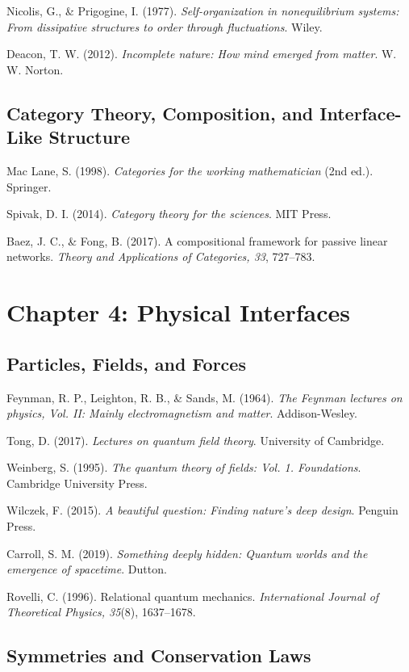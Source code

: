 \documentclass[
  openright]{book}
\begin{document}
Nicolis, G., \& Prigogine, I. (1977). \emph{Self-organization in
nonequilibrium systems: From dissipative structures to order through
fluctuations}. Wiley.

Deacon, T. W. (2012). \emph{Incomplete nature: How mind emerged from
matter}. W. W. Norton.

\subsection{Category Theory, Composition, and Interface-Like
Structure}\label{category-theory-composition-and-interface-like-structure-1}

Mac Lane, S. (1998). \emph{Categories for the working mathematician}
(2nd ed.). Springer.

Spivak, D. I. (2014). \emph{Category theory for the sciences}. MIT
Press.

Baez, J. C., \& Fong, B. (2017). A compositional framework for passive
linear networks. \emph{Theory and Applications of Categories, 33},
727--783.

\section{Chapter 4: Physical
Interfaces}\label{chapter-4-physical-interfaces}

\subsection{Particles, Fields, and
Forces}\label{particles-fields-and-forces}

Feynman, R. P., Leighton, R. B., \& Sands, M. (1964). \emph{The Feynman
lectures on physics, Vol. II: Mainly electromagnetism and matter}.
Addison-Wesley.

Tong, D. (2017). \emph{Lectures on quantum field theory}. University of
Cambridge.

Weinberg, S. (1995). \emph{The quantum theory of fields: Vol. 1.
Foundations}. Cambridge University Press.

Wilczek, F. (2015). \emph{A beautiful question: Finding nature's deep
design}. Penguin Press.

Carroll, S. M. (2019). \emph{Something deeply hidden: Quantum worlds and
the emergence of spacetime}. Dutton.

Rovelli, C. (1996). Relational quantum mechanics. \emph{International
Journal of Theoretical Physics, 35}(8), 1637--1678.

\subsection{Symmetries and Conservation
Laws}\label{symmetries-and-conservation-laws-1}
\end{document}
